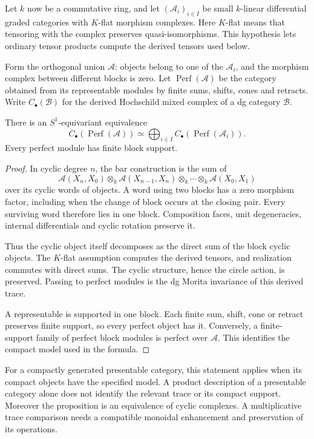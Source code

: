 Let $k$ now be a commutative ring, and let $(\mathcal A_i)_{i\in I}$ be
small $k$-linear differential graded categories with $K$-flat morphism
complexes. Here $K$-flat means that tensoring with the complex preserves
quasi-isomorphisms. This hypothesis lets ordinary tensor products compute
the derived tensors used below.

Form the orthogonal union $\mathcal A$: objects belong to one of the
$\mathcal A_i$, and the morphism complex between different blocks is zero.
Let $\operatorname{Perf}(\mathcal A)$ be the category obtained from its
representable modules by finite sums, shifts, cones and retracts.
Write $C_\bullet(\mathcal B)$ for the derived Hochschild mixed complex
of a dg category $\mathcal B$.

\begin{proposition}
\label{v4-arith:traces:blocks}
There is an $S^1$-equivariant equivalence
\[
 C_\bullet(\operatorname{Perf}(\mathcal A))
 \simeq\bigoplus_{i\in I}
       C_\bullet(\operatorname{Perf}(\mathcal A_i)).
\]
Every perfect module has finite block support.
\end{proposition}
\begin{proof}
In cyclic degree $n$, the bar construction is the sum of
\[
 \mathcal A(X_n,X_0)\otimes_k
 \mathcal A(X_{n-1},X_n)\otimes_k\cdots\otimes_k
 \mathcal A(X_0,X_1)
\]
over its cyclic words of objects. A word using two blocks has a zero
morphism factor, including when the change of block occurs at the closing
pair. Every surviving word therefore lies in one block. Composition faces,
unit degeneracies, internal differentials and cyclic rotation preserve it.

Thus the cyclic object itself decomposes as the direct sum of the block
cyclic objects. The $K$-flat assumption computes the derived tensors, and
realization commutes with direct sums. The cyclic structure, hence the
circle action, is preserved. Passing to perfect modules is the dg Morita
invariance of this derived trace.

A representable is supported in one block. Each finite sum, shift, cone or
retract preserves finite support, so every perfect object has it.
Conversely, a finite-support family of perfect block modules is perfect over
$\mathcal A$. This identifies the compact model used in the formula.
\end{proof}

For a compactly generated presentable category, this statement applies when
its compact objects have the specified model. A product description of a
presentable category alone does not identify the relevant trace or its
compact support. Moreover the proposition is an equivalence of cyclic
complexes. A multiplicative trace comparison needs a compatible monoidal
enhancement and preservation of its operations.


